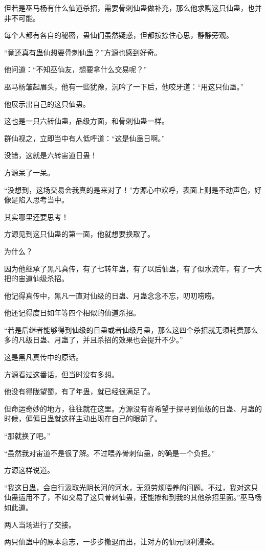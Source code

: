 \begin{this_body}
但若是巫马杨有什么仙道杀招，需要骨刺仙蛊做补充，那么他求购这只仙蛊，也并非不可能。

每个人都有各自的秘密，蛊仙们虽然疑惑，但都按捺住心思，静静旁观。

“竟还真有蛊仙想要骨刺仙蛊？”方源也感到好奇。

他问道：“不知巫仙友，想要拿什么交易呢？”

巫马杨皱起眉头，他有一些犹豫，沉吟了一下后，他咬牙道：“用这只仙蛊。”

他展示出自己的这只仙蛊。

这也是一只六转仙蛊，品级方面，和骨刺仙蛊一样。

群仙视之，立即当中有人低呼道：“这是仙蛊日啊。”

没错，这就是六转宙道日蛊！

方源呆了一呆。

“没想到，这场交易会我真的是来对了！”方源心中欢呼，表面上则是不动声色，好像是陷入思考当中。

其实哪里还要思考！

方源见到这只仙蛊的第一面，他就想要换取了。

为什么？

因为他继承了黑凡真传，有了七转年蛊，有了以后仙蛊，有了似水流年，有了一大把的宙道仙级杀招。

他记得真传中，黑凡一直对仙级的日蛊、月蛊念念不忘，叨叨唠唠。

他还记得度日如年等四个相似的仙道杀招。

“若是后继者能够得到仙级的日蛊或者仙级月蛊，那么这四个杀招就无须耗费那么多的凡级日蛊、月蛊了，并且杀招的效果也会提升不少。”

这是黑凡真传中的原话。

方源看过这番话，但当时没有多想。

他没有得陇望蜀，有了年蛊，就已经很满足了。

但命运奇妙的地方，往往就在这里。方源没有寄希望于探寻到仙级的日蛊、月蛊的时候，偏偏日蛊就这样主动出现在自己的眼前了。

“那就换了吧。”

“虽然我对宙道不是很了解。不过喂养骨刺仙蛊，的确是一个负担。”

方源这样说道。

“我这日蛊，会自行汲取光阴长河的河水，无须劳烦喂养的问题。不过，我对这只仙蛊运用不了，不如交易了这只骨刺仙蛊，还能掺和到我的其他杀招里面。”巫马杨如此道。

两人当场进行了交接。

两只仙蛊中的原本意志，一步步撤退而出，让对方的仙元顺利浸染。


\end{this_body}
